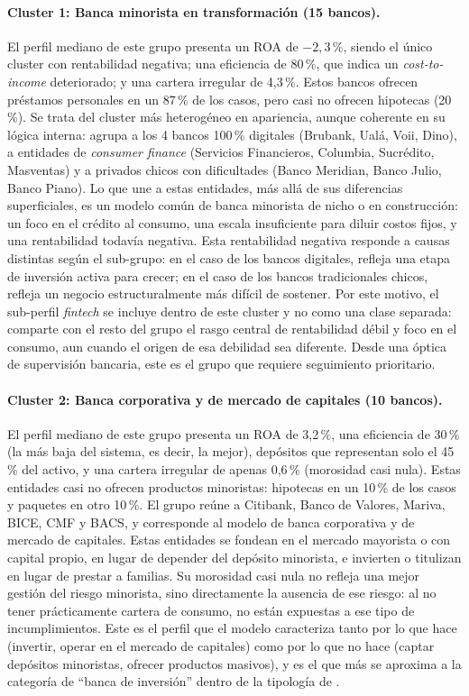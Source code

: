 \documentclass[11pt,a4paper]{article}
\begin{document}
\paragraph{Cluster 1: Banca minorista en transformación (15 bancos).}
El perfil mediano de este grupo presenta un ROA de $-2{,}3$\,\%, siendo el único cluster con rentabilidad
negativa; una eficiencia de 80\,\%, que indica un \textit{cost-to-income} deteriorado; y una cartera
irregular de 4,3\,\%. Estos bancos ofrecen préstamos personales en un 87\,\% de los casos, pero casi no
ofrecen hipotecas (20\,\%). Se trata del cluster más heterogéneo en apariencia, aunque coherente en su
lógica interna: agrupa a los 4 bancos 100\,\% digitales (Brubank, Ualá, Voii, Dino), a entidades de
\textit{consumer finance} (Servicios Financieros, Columbia, Sucrédito, Masventas) y a privados chicos con
dificultades (Banco Meridian, Banco Julio, Banco Piano). Lo que une a estas entidades, más allá de sus
diferencias superficiales, es un modelo común de banca minorista de nicho o en construcción:
un foco en el crédito al consumo, una escala insuficiente para diluir costos fijos, y una rentabilidad
todavía negativa. Esta rentabilidad negativa responde a causas distintas según el sub-grupo: en el caso
de los bancos digitales, refleja una etapa de inversión activa para crecer; en el caso de los bancos
tradicionales chicos, refleja un negocio estructuralmente más difícil de sostener. Por este motivo, el
sub-perfil \textit{fintech} se incluye dentro de este cluster y no como una clase separada: comparte con
el resto del grupo el rasgo central de rentabilidad débil y foco en el consumo, aun cuando el origen de
esa debilidad sea diferente. Desde una óptica de supervisión bancaria, este es el grupo que requiere
seguimiento prioritario.

\paragraph{Cluster 2: Banca corporativa y de mercado de capitales (10 bancos).}
El perfil mediano de este grupo presenta un ROA de 3,2\,\%, una eficiencia de 30\,\% (la más baja del
sistema, es decir, la mejor), depósitos que representan solo el 45\,\% del activo, y una cartera
irregular de apenas 0,6\,\% (morosidad casi nula). Estas entidades casi no ofrecen productos minoristas:
hipotecas en un 10\,\% de los casos y paquetes en otro 10\,\%. El grupo reúne a Citibank, Banco de
Valores, Mariva, BICE, CMF y BACS, y corresponde al modelo de banca corporativa y de mercado de
capitales. Estas entidades se fondean en el mercado mayorista o con capital propio, en lugar de
depender del depósito minorista, e invierten o titulizan en lugar de prestar a familias. Su morosidad
casi nula no refleja una mejor gestión del riesgo minorista, sino directamente la ausencia de ese
riesgo: al no tener prácticamente cartera de consumo, no están expuestas a ese tipo de incumplimientos.
Este es el perfil que el modelo caracteriza tanto por lo que hace (invertir, operar en el mercado de
capitales) como por lo que no hace (captar depósitos minoristas, ofrecer productos masivos), y es el
que más se aproxima a la categoría de ``banca de inversión'' dentro de la tipología de
\citet{roengpitya2014}.
\end{document}
